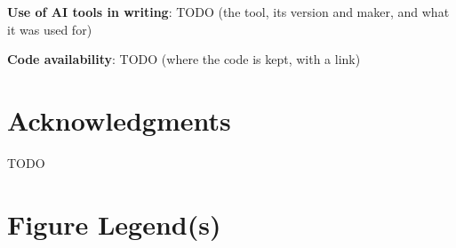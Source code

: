 \documentclass[11pt]{article}
\begin{document}

\textbf{Use of AI tools in writing}: TODO (the tool, its version and maker, and what it was used for)

\textbf{Code availability}: TODO (where the code is kept, with a link)


\section*{Acknowledgments}
TODO

\printbibliography[env=simplebib]

\clearpage
\section*{Figure Legend(s)}
\makeatletter
{}%
\makeatother
\end{document}
